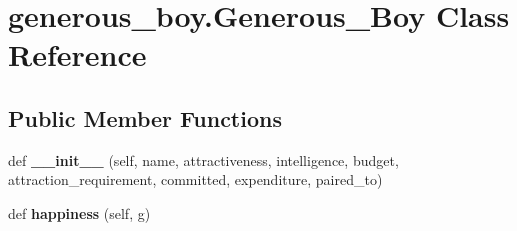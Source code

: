 \hypertarget{classgenerous__boy_1_1_generous___boy}{}\section{generous\+\_\+boy.\+Generous\+\_\+\+Boy Class Reference}
\label{classgenerous__boy_1_1_generous___boy}
\subsection*{Public Member Functions}
\begin{DoxyCompactItemize}
\item 
\mbox{\label{classgenerous__boy_1_1_generous___boy_a0b255a2a43d52138254fb384eeb8ca4b}} 
def {\bfseries \+\_\+\+\_\+init\+\_\+\+\_\+} (self, name, attractiveness, intelligence, budget, attraction\+\_\+requirement, committed, expenditure, paired\+\_\+to)
\item 
\mbox{\label{classgenerous__boy_1_1_generous___boy_a0fe95bfe65726fcffdf859b0ae03932f}} 
def {\bfseries happiness} (self, g)
\end{DoxyCompactItemize}

